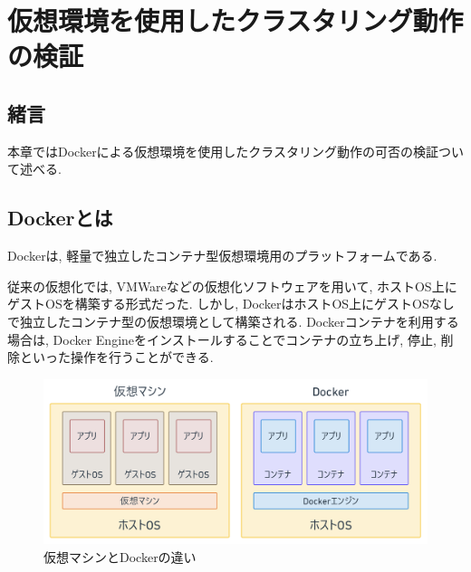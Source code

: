 \chapter{仮想環境を使用したクラスタリング動作の検証}
\label{chap:fourth}

\section{緒言}
本章ではDockerによる仮想環境を使用したクラスタリング動作の可否の検証ついて述べる.





\section{Dockerとは}
Dockerは, 軽量で独立したコンテナ型仮想環境用のプラットフォームである.

従来の仮想化では, VMWareなどの仮想化ソフトウェアを用いて, ホストOS上にゲストOSを構築する形式だった.
しかし, DockerはホストOS上にゲストOSなしで独立したコンテナ型の仮想環境として構築される.
Dockerコンテナを利用する場合は, Docker Engineをインストールすることでコンテナの立ち上げ, 停止, 削除といった操作を行うことができる.

\begin{figure}[H]
  \begin{center}
    \includegraphics[width=140mm]{sotu/figure/docker-vmware.png}
    \caption{仮想マシンとDockerの違い}
    \label{4-p1}
  \end{center}
\end{figure}

